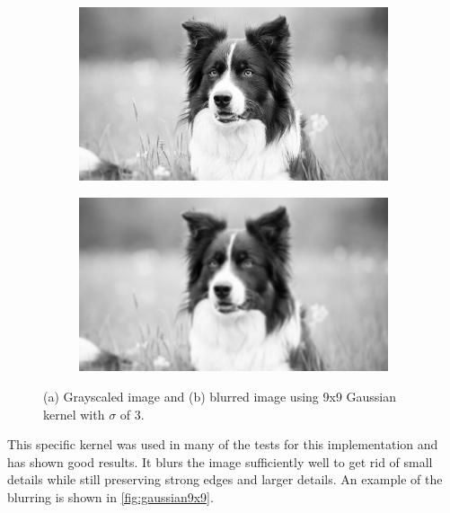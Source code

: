 \documentclass[12pt]{article}
\begin{document}
			\begin{figure}[H]
				\centering
				\begin{subfigure}[b]{0.45\linewidth}
					\includegraphics[width=1\linewidth,keepaspectratio]{../examples/dog/dog_gray}
					\subcaption{}
					\label{fig:gaussian9x9orig}
				\end{subfigure} %
				\begin{subfigure}[b]{0.45\linewidth}
					\includegraphics[width=1\linewidth,keepaspectratio]{../examples/dog/dog_gaussian-9x9}
					\subcaption{}
					\label{fig:gaussian9x9blur}
				\end{subfigure} %
				\caption{\small (a) Grayscaled image and (b) blurred image using 9x9 Gaussian kernel with $\sigma$ of 3.}
				\label{fig:gaussian9x9}
			\end{figure} %

			This specific kernel was used in many of the tests for this implementation and has shown good results. It blurs the image sufficiently well to get rid of small details while still preserving strong edges and larger details. An example of the blurring is shown in \autoref{fig:gaussian9x9}.
\end{document}
